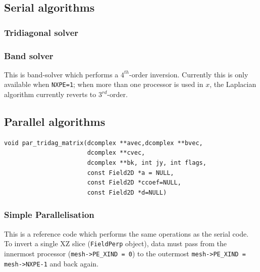 \documentclass[12pt]{article}
\newcommand{\code}[1]{\texttt{#1}}
\begin{document}
\subsection{Serial algorithms}

\subsubsection{Tridiagonal solver}


\subsubsection{Band solver}

This is band-solver which performs a $4^{th}$-order inversion. Currently this
is only available when \code{NXPE=1}; when more than one processor is used in $x$,
the Laplacian algorithm currently reverts to $3^{rd}$-order.

\subsection{Parallel algorithms}

\begin{lstlisting}
void par_tridag_matrix(dcomplex **avec,dcomplex **bvec,
                       dcomplex **cvec,
                       dcomplex **bk, int jy, int flags, 
                       const Field2D *a = NULL, 
                       const Field2D *ccoef=NULL,
                       const Field2D *d=NULL)
\end{lstlisting}

\subsubsection{Simple Parallelisation}

This is a reference code which performs the same operations as the serial code.
To invert a single XZ slice (\lstinline!FieldPerp! object), data must pass
from the innermost processor (\lstinline!mesh->PE_XIND = 0!) to the outermost
\lstinline!mesh->PE_XIND = mesh->NXPE-1! and back again.
\end{document}
